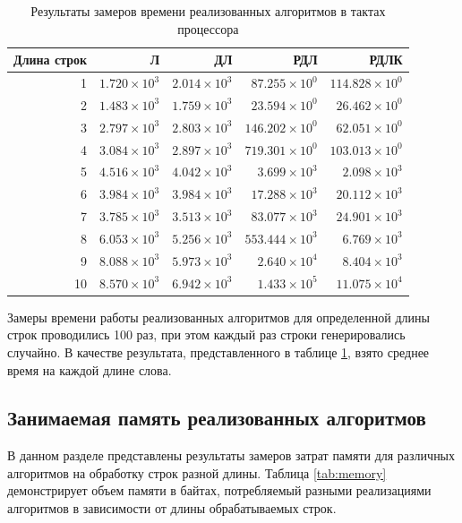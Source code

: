 \begin{table}[hbtp]
	\centering
	\caption{Результаты замеров времени реализованных алгоритмов в тактах процессора}
	\label{tab:time}
	\begin{tabular}{|r|r|r|r|r|}
		\hline
		Длина строк & Л & ДЛ & РДЛ & РДЛК \\
		\hline
		1 & $1.720 \times 10^3$ & $2.014 \times 10^3$ & $87.255 \times 10^0$ & $114.828 \times 10^0$ \\
		2 & $1.483 \times 10^3$ & $1.759 \times 10^3$ & $23.594 \times 10^0$ & $26.462 \times 10^0$ \\
		3 & $2.797 \times 10^3$ & $2.803 \times 10^3$ & $146.202 \times 10^0$ & $62.051 \times 10^0$ \\
		4 & $3.084 \times 10^3$ & $2.897 \times 10^3$ & $719.301 \times 10^0$ & $103.013 \times 10^0$ \\
		5 & $4.516 \times 10^3$ & $4.042 \times 10^3$ & $3.699 \times 10^3$ & $2.098 \times 10^3$ \\
		6 & $3.984 \times 10^3$ & $3.984 \times 10^3$ & $17.288 \times 10^3$ & $20.112 \times 10^3$ \\
		7 & $3.785 \times 10^3$ & $3.513 \times 10^3$ & $83.077 \times 10^3$ & $24.901 \times 10^3$ \\
		8 & $6.053 \times 10^3$ & $5.256 \times 10^3$ & $553.444 \times 10^3$ & $6.769 \times 10^3$ \\
		9 & $8.088 \times 10^3$ & $5.973 \times 10^3$ & $2.640 \times 10^4$ & $8.404 \times 10^3$ \\
		10 & $8.570 \times 10^3$ & $6.942 \times 10^3$ & $1.433 \times 10^5$ & $11.075 \times 10^4$ \\
		\hline
	\end{tabular}
\end{table}

Замеры времени работы реализованных алгоритмов для определенной длины строк проводились 100 раз, при этом каждый раз строки генерировались случайно. В качестве результата, представленного в таблице \ref{tab:time}, взято среднее время на каждой длине слова.

\pagebreak
\newpage

\subsection{Занимаемая память реализованных алгоритмов}

В данном разделе представлены результаты замеров затрат памяти для различных алгоритмов на обработку строк разной длины. Таблица \ref{tab:memory} демонстрирует объем памяти в байтах, потребляемый разными реализациями алгоритмов в зависимости от длины обрабатываемых строк.

